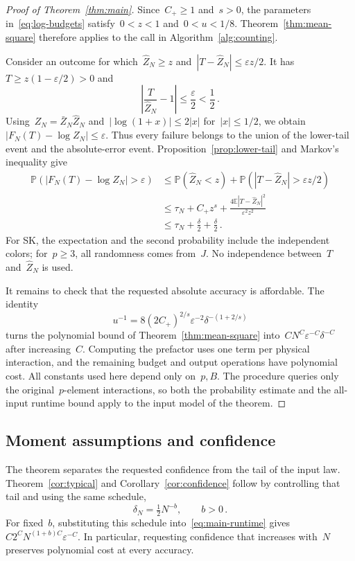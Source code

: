 \documentclass[10pt]{article}
\theoremstyle{plain}
\theoremstyle{definition}
\theoremstyle{remark}
\begin{document}
\begin{proof}[Proof of Theorem~\ref{thm:main}]
Since~$C_+\ge1$ and~$s>0$, the parameters in~\eqref{eq:log-budgets} satisfy~$0<z<1$ and~$0<u<1/8$. Theorem~\ref{thm:mean-square} therefore applies to the call in Algorithm~\ref{alg:counting}.

Consider an outcome for which~$\hat Z_N\ge z$ and~$|T-\hat Z_N|\le\varepsilon z/2$. It has~$T\ge z(1-\varepsilon/2)>0$ and
\begin{equation*}
 \left|\frac{T}{\hat Z_N}-1\right|\le\frac\varepsilon2<\frac12\,.
\end{equation*}
Using~$Z_N=\bar Z_N\hat Z_N$ and~$|\log(1+x)|\le2|x|$ for~$|x|\le1/2$, we obtain~$|F_N(T)-\log Z_N|\le\varepsilon$. Thus every failure belongs to the union of the lower-tail event and the absolute-error event. Proposition~\ref{prop:lower-tail} and Markov's inequality give
\begin{align*}
 \mathbb P(|F_N(T)-\log Z_N|>\varepsilon)
 &\le \mathbb P(\hat Z_N<z)+\mathbb P(|T-\hat Z_N|>\varepsilon z/2)\\
 &\le\tau_N+C_+z^s+\frac{4\mathbb E|T-\hat Z_N|^2}{\varepsilon^2z^2}\\
 &\le\tau_N+\frac\delta2+\frac\delta2\,.
\end{align*}
For SK, the expectation and the second probability include the independent colors; for~$p\ge3$, all randomness comes from~$J$. No independence between~$T$ and~$\hat Z_N$ is used.

It remains to check that the requested absolute accuracy is affordable. The identity
\begin{equation*}
 u^{-1}=8(2C_+)^{2/s}\varepsilon^{-2}\delta^{-(1+2/s)}
\end{equation*}
turns the polynomial bound of Theorem~\ref{thm:mean-square} into~$CN^C\varepsilon^{-C}\delta^{-C}$ after increasing~$C$. Computing the prefactor uses one term per physical interaction, and the remaining budget and output operations have polynomial cost. All constants used here depend only on~$p,B$. The procedure queries only the original~$p$-element interactions, so both the probability estimate and the all-input runtime bound apply to the input model of the theorem.
\end{proof}

\subsection{Moment assumptions and confidence}
The theorem separates the requested confidence from the tail of the input law. Theorem~\ref{cor:typical} and Corollary~\ref{cor:confidence} follow by controlling that tail and using the same schedule,
\begin{equation}\label{eq:confidence-schedule}
 \delta_N=\tfrac12N^{-b},\qquad b>0\,.
\end{equation}
For fixed~$b$, substituting this schedule into~\eqref{eq:main-runtime} gives~$C2^CN^{(1+b)C}\varepsilon^{-C}$. In particular, requesting confidence that increases with~$N$ preserves polynomial cost at every accuracy.
\end{document}
